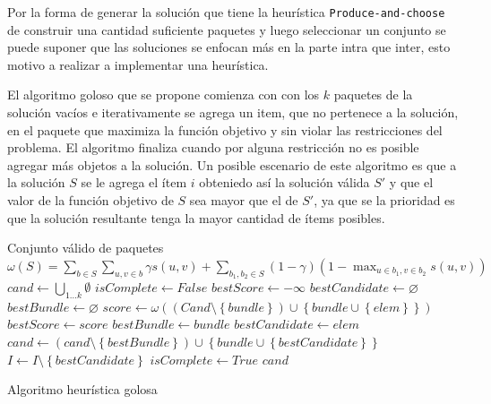 Por la forma de generar la solución que tiene la heurística \texttt{Produce-and-choose} de construir una cantidad suficiente paquetes y luego seleccionar un conjunto se puede suponer que las soluciones se enfocan más en la parte intra que inter, esto motivo a realizar a implementar una heurística.

El algoritmo goloso que se propone comienza con con los $k$ paquetes de la solución vacíos e iterativamente se agrega un item, que no pertenece a la solución, en el paquete que maximiza la función objetivo y sin violar las restricciones del problema. El algoritmo finaliza cuando por alguna restricción no es posible agregar más objetos a la solución. Un posible escenario de este algoritmo es que a la solución $S$ se le agrega el ítem $i$ obteniedo así la solución válida $S'$ y que el valor de la función objetivo de $S$ sea mayor que el de $S'$, ya que se la prioridad es que la solución resultante tenga la mayor cantidad de ítems posibles.

\begin{algorithm}[H]
\begin{algorithmic}[1]
\ENSURE Conjunto válido de paquetes
\STATE $\omega(S) = \sum_{b \in S}{\sum_{u,v \in b}{\gamma s(u,v)}} + \sum_{b_1,b_2 \in S}{(1-\gamma) (1-\max_{u \in b_1, v \in b_2}{s(u,v)})}$
\STATE $cand \leftarrow \bigcup_{1 \ldots k}\emptyset$
\STATE $isComplete \leftarrow False$
  \STATE $bestScore \leftarrow -\infty$
  \STATE $bestCandidate \leftarrow \varnothing$
  \STATE $bestBundle \leftarrow \varnothing$
        \STATE $score \leftarrow \omega((Cand \setminus \left\{bundle\right\}) \cup \left\{bundle \cup \left\{elem\right\}\right\})$
          \STATE $bestScore \leftarrow score$
          \STATE $bestBundle \leftarrow bundle$
          \STATE $bestCandidate \leftarrow elem$
        \ENDIF
      \ENDIF
    \ENDFOR
  \ENDFOR
		\STATE $cand \leftarrow (cand \setminus \left\{bestBundle\right\}) \cup \left\{bundle \cup \left\{bestCandidate\right\}\right\}$
		\STATE $I \leftarrow I \setminus \left\{bestCandidate\right\}$
	\ELSE
		\STATE $isComplete \leftarrow True$
	\ENDIF
\ENDWHILE
\RETURN $cand$
\end{algorithmic}
\caption{Algoritmo heurística golosa}\label{alg:algHeuGol}
\end{algorithm}

